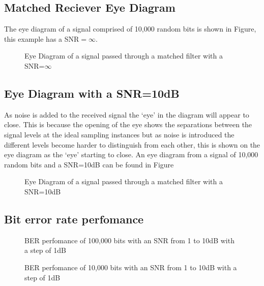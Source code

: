 \subsection{Matched Reciever Eye Diagram}

The eye diagram of a signal comprised of 10,000 random bits is shown in Figure, this example has a SNR$=\infty$.
\begin{figure}[h]
    \begin{center}
        
    \end{center}
    \caption{Eye Diagram of a signal passed through a matched filter with a SNR=$\infty$}
    \label{fig:eye-no-noise}
\end{figure}

\subsection{Eye Diagram with a SNR=10dB}
As noise is added to the received signal the `eye' in the diagram will appear to close. 
This is because the opening of the eye shows the separations between the signal levels
at the ideal sampling instances but as noise is introduced the different levels become
harder to distinguish from each other, this is shown on the eye diagram as the `eye' 
starting to close. An eye diagram from a signal of 10,000 random bits and a SNR=10dB
can be found in Figure

\begin{figure}[h]
    \begin{center}
        
    \end{center}
    \caption{Eye Diagram of a signal passed through a matched filter with a SNR=10dB}
    \label{fig:eye-noise}
\end{figure}

\subsection{Bit error rate perfomance}

\begin{figure}[h]
    \begin{center}
        
    \end{center}
    \caption{BER perfomance of 100,000 bits with an SNR from 1 to 10dB with a step of 1dB}
    \label{fig:bit-error}
\end{figure}

\begin{figure}[h]
    \begin{center}
        
    \end{center}
    \caption{BER perfomance of 10,000 bits with an SNR from 1 to 10dB with a step of 1dB}
    \label{fig:bit-error}
\end{figure}

